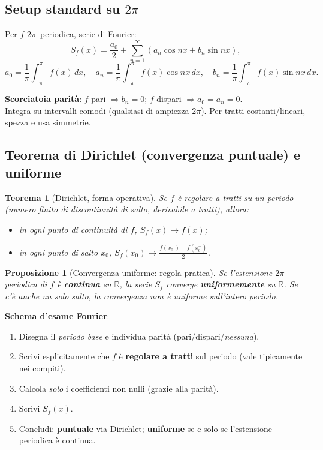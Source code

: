 \documentclass[11pt,a4paper]{article}
\newcommand{\R}{\mathbb{R}}
\newtheorem{theorem}{Teorema}
\newtheorem{proposition}{Proposizione}
\theoremstyle{definition}
\begin{document}
\subsection{Setup standard su $2\pi$}
\begin{defbox}
Per $f$ $2\pi$–periodica, serie di Fourier:
\[
S_f(x)=\frac{a_0}{2}+\sum_{n=1}^\infty\left(a_n\cos nx+b_n\sin nx\right),
\]
\[
a_0=\frac{1}{\pi}\int_{-\pi}^{\pi} f(x)\,dx,\quad
a_n=\frac{1}{\pi}\int_{-\pi}^{\pi} f(x)\cos nx\,dx,\quad
b_n=\frac{1}{\pi}\int_{-\pi}^{\pi} f(x)\sin nx\,dx.
\]
\end{defbox}

\begin{ideabox}
\textbf{Scorciatoia parità}:\; $f$ pari $\Rightarrow b_n=0$;\; $f$ dispari $\Rightarrow a_0=a_n=0$.\\
Integra su intervalli comodi (qualsiasi di ampiezza $2\pi$). Per tratti costanti/lineari, spezza e usa simmetrie.
\end{ideabox}

\subsection{Teorema di Dirichlet (convergenza puntuale) e uniforme}
\begin{theorem}[Dirichlet, forma operativa]
Se $f$ è \emph{regolare a tratti} su un periodo (numero finito di discontinuità di salto, derivabile a tratti), allora:
\begin{itemize}
\item in ogni punto di \emph{continuità} di $f$, $S_f(x)\to f(x)$;
\item in ogni \emph{punto di salto} $x_0$, $S_f(x_0)\to \frac{f(x_0^-)+f(x_0^+)}{2}$.
\end{itemize}
\end{theorem}

\begin{proposition}[Convergenza uniforme: regola pratica]
Se l'estensione $2\pi$–periodica di $f$ è \textbf{continua} su $\R$, la serie $S_f$ converge \textbf{uniformemente} su $\R$. 
Se c'è \emph{anche un solo salto}, la convergenza non è uniforme sull'intero periodo.
\end{proposition}

\begin{exambox}
\textbf{Schema d’esame Fourier}:
\begin{enumerate}[(1)]
\item Disegna il \emph{periodo base} e individua parità (pari/dispari/\textit{nessuna}).
\item Scrivi esplicitamente che $f$ è \textbf{regolare a tratti} sul periodo (vale tipicamente nei compiti).
\item Calcola \emph{solo} i coefficienti non nulli (grazie alla parità).
\item Scrivi $S_f(x)$.
\item Concludi: \textbf{puntuale} via Dirichlet; \textbf{uniforme} se e solo se l’estensione periodica è continua.
\end{enumerate}
\end{exambox}
\end{document}
